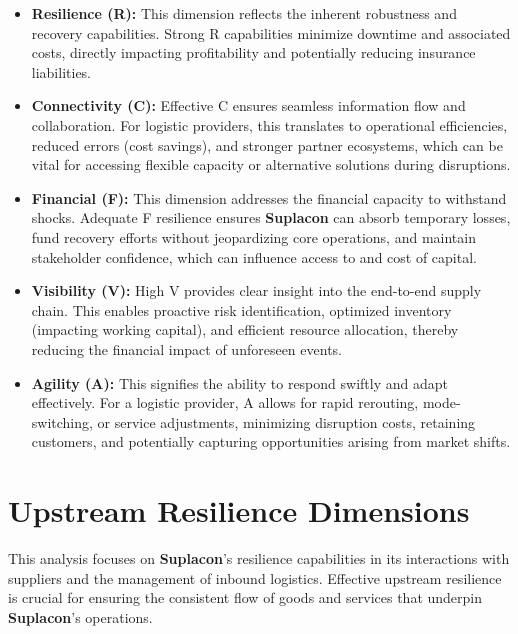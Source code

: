 \documentclass[
  oneside,
  open=any,
  fontsize=11pt]{scrbook}
\providecommand{\tightlist}{%
  \setlength{\itemsep}{0pt}\setlength{\parskip}{0pt}}
\begin{document}
\begin{itemize}
\tightlist
\item
  \textbf{Resilience (R):} This dimension reflects the inherent
  robustness and recovery capabilities. Strong R capabilities minimize
  downtime and associated costs, directly impacting profitability and
  potentially reducing insurance liabilities.
\item
  \textbf{Connectivity (C):} Effective C ensures seamless information
  flow and collaboration. For logistic providers, this translates to
  operational efficiencies, reduced errors (cost savings), and stronger
  partner ecosystems, which can be vital for accessing flexible capacity
  or alternative solutions during disruptions.
\item
  \textbf{Financial (F):} This dimension addresses the financial
  capacity to withstand shocks. Adequate F resilience ensures
  \textbf{Suplacon} can absorb temporary losses, fund recovery efforts
  without jeopardizing core operations, and maintain stakeholder
  confidence, which can influence access to and cost of capital.
\item
  \textbf{Visibility (V):} High V provides clear insight into the
  end-to-end supply chain. This enables proactive risk identification,
  optimized inventory (impacting working capital), and efficient
  resource allocation, thereby reducing the financial impact of
  unforeseen events.
\item
  \textbf{Agility (A):} This signifies the ability to respond swiftly
  and adapt effectively. For a logistic provider, A allows for rapid
  rerouting, mode-switching, or service adjustments, minimizing
  disruption costs, retaining customers, and potentially capturing
  opportunities arising from market shifts.
\end{itemize}

\section{Upstream Resilience
Dimensions}\label{upstream-resilience-dimensions}

This analysis focuses on \textbf{Suplacon}'s resilience capabilities in
its interactions with suppliers and the management of inbound logistics.
Effective upstream resilience is crucial for ensuring the consistent
flow of goods and services that underpin \textbf{Suplacon}'s operations.
\end{document}
